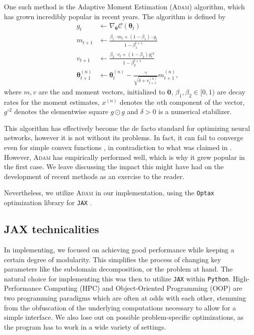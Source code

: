 One such method is the Adaptive Moment Estimation (\textsc{Adam}) \cite{kingma2017adam} algorithm, which has grown incredibly popular in recent years.
The algorithm is defined by
\begin{equation}
\begin{split}
    g_{t} &\gets \nabla_{\boldsymbol{\theta}}\mathcal{C}(\boldsymbol{\theta}_t) \\
    m_{t+1} &\gets \frac{\beta_1 \cdot m_t + (1-\beta_1) \cdot g_t}{1 - \beta_1^{t+1}} \\
    v_{t+1} &\gets \frac{\beta_2 \cdot v_t + (1 - \beta_2)g_t^{\circ 2}}{1 - \beta_2^{t+1}} \\
    \boldsymbol{\theta}_{t+1}^{(n)} &\gets \boldsymbol{\theta}_t^{(n)} - \frac{\gamma}{\sqrt{\delta + v_{t+1}^{(n)}}} m_{t+1}^{(n)},
\end{split}
\end{equation}
where $m, v$ are the  and  moment vectors, initialized to $\boldsymbol{0}$, $\beta_1, \beta_2 \in [0,1)$ are decay rates for the moment estimates, $x^{(n)}$ denotes the $n$th component of the vector, $g^{\circ 2}$ denotes the elementwise square $g \odot g$ and $\delta > 0$ is a numerical stabilizer. 

This algorithm has effectively become the de facto standard for optimizing neural networks, however it is not without its problems.
In fact, it can fail to converge even for simple convex functions \cite{reddi2019convergence}, in contradiction to what was claimed in \cite{kingma2017adam}.
However, \textsc{Adam} has empirically performed well, which is why it grew popular in the first case.
We leave discussing the impact this might have had on the development of recent methods as an exercise to the reader.

Nevertheless, we utilize \textsc{Adam} in our implementation, using the \verb|Optax| \cite{deepmind2020jax} optimization library for \verb|JAX| \cite{jax2018github}.

\subsection{JAX technicalities}\label{sec:JAX}
In implementing, we focused on achieving good performance while keeping a certain degree of modularity.
This simplifies the process of changing key parameters like the subdomain decomposition, or the problem at hand.
The natural choice for implementing this was then to utilize \verb|JAX| \cite{jax2018github} within \verb|Python|.
High-Performance Computing (HPC) and Object-Oriented Programming (OOP) are two programming paradigms which are often at odds with each other, stemming from the obfuscation of the underlying computations necessary to allow for a simple interface.
We also lose out on possible problem-specific optimizations, as the program has to work in a wide variety of settings.

